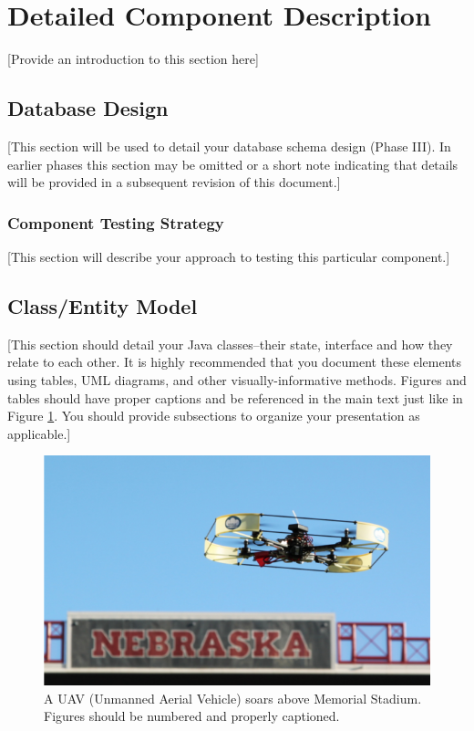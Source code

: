 \documentclass[12pt]{scrartcl} %
\begin{document}
\section{Detailed Component Description}

[Provide an introduction to this section here]

\subsection{Database Design}

[This section will be used to detail your database schema design (Phase III).  In earlier phases this section may be omitted or a short note indicating that details will be provided in a subsequent revision of this document.]

\subsubsection{Component Testing Strategy}

[This section will describe your approach to testing this particular component.]

\subsection{Class/Entity Model}

[This section should detail your Java classes--their state, interface and how they relate to each other.  It is highly recommended that you document these elements using tables, UML diagrams, and other visually-informative methods.  Figures and tables should have proper captions and be referenced in the main text just like in Figure \ref{figure:uav}.  You should provide subsections to organize your presentation as applicable.]

\begin{figure}
\centering
\includegraphics[scale=1.0]{uavsUNL}
\caption{A UAV (Unmanned Aerial Vehicle) soars above Memorial Stadium.  Figures should be numbered and properly captioned.}
\label{figure:uav}
\end{figure}
\end{document}
